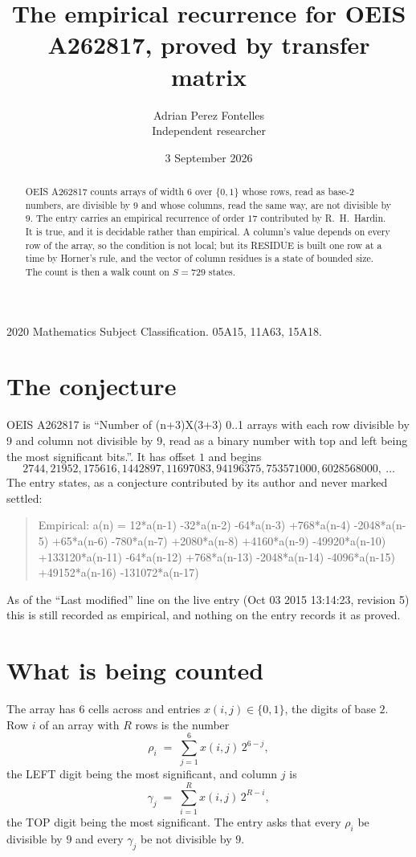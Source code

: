 \documentclass[11pt,a4paper]{article}
\title{The empirical recurrence for OEIS A262817, proved by transfer matrix}
\author{Adrian Perez Fontelles\\ \small Independent researcher}
\date{3 September 2026}
\theoremstyle{plain}
\theoremstyle{definition}
\begin{document}
\maketitle

\begin{abstract}
OEIS A262817 counts arrays of width $6$ over $\{0,1\}$ whose rows, read as base-$2$
numbers, are divisible by $9$ and whose columns, read the same way, are not divisible by
$9$. The entry carries an empirical recurrence of order $17$ contributed by
R.~H.~Hardin. It is true, and it is decidable rather than empirical. A column's value depends on
every row of the array, so the condition is not local; but its RESIDUE is built one row at a
time by Horner's rule, and the vector of column residues is a state of bounded size. The count
is then a walk count on $S=729$ states.
\end{abstract}

\noindent\small 2020 Mathematics Subject Classification. 05A15, 11A63, 15A18.\normalsize

\section{The conjecture}

OEIS A262817 is ``Number of (n+3)X(3+3) 0..1 arrays with each row divisible by 9 and column not divisible by 9, read as a binary number with top and left being the most significant bits.''. It has offset $1$ and begins
\[
2744, 21952, 175616, 1442897, 11697083, 94196375, 753571000, 6028568000,\ \dots
\]
The entry states, as a conjecture contributed by its author and never marked settled:
\begin{quote}
Empirical: a(n) = 12*a(n-1) -32*a(n-2) -64*a(n-3) +768*a(n-4) -2048*a(n-5) +65*a(n-6) -780*a(n-7) +2080*a(n-8) +4160*a(n-9) -49920*a(n-10) +133120*a(n-11) -64*a(n-12) +768*a(n-13) -2048*a(n-14) -4096*a(n-15) +49152*a(n-16) -131072*a(n-17)
\end{quote}
As of the ``Last modified'' line on the live entry (Oct 03 2015 13:14:23, revision 5) this is still
recorded as empirical, and nothing on the entry records it as proved.

\section{What is being counted}

The array has $6$ cells across and entries $x(i,j)\in\{0,1\}$, the digits of
base $2$. Row $i$ of an array with $R$ rows is the number
\[
\rho_i\;=\;\sum_{j=1}^{6}x(i,j)\,2^{6-j} ,
\]
the LEFT digit being the most significant, and column $j$ is
\[
\gamma_j\;=\;\sum_{i=1}^{R}x(i,j)\,2^{R-i} ,
\]
the TOP digit being the most significant. The entry asks that every $\rho_i$ be divisible by
$9$ and every $\gamma_j$ be not divisible by $9$.
\end{document}
